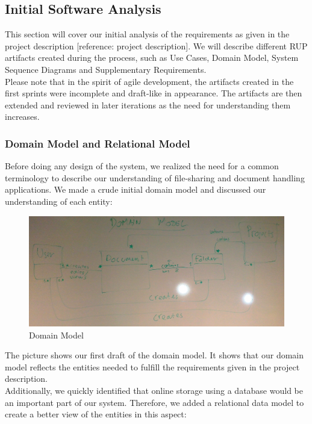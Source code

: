 \subsection{Initial Software Analysis}
This section will cover our initial analysis of the requirements as given in the project description [reference: project description]. We will describe different RUP artifacts created during the process, such as Use Cases, Domain Model, System Sequence Diagrams and Supplementary Requirements.\\
Please note that in the spirit of agile development, the artifacts created in the first sprints were incomplete and draft-like in appearance. The artifacts are then extended and reviewed in later iterations as the need for understanding them increases.\\
\subsubsection{Domain Model and Relational Model}
Before doing any design of the system, we realized the need for a common terminology to describe our understanding of file-sharing and document handling applications. We made a crude initial domain model and discussed our understanding of each entity:\\
\begin{figure}[H]
  \includegraphics[width=\textwidth,natwidth=2208,natheight=957]{illustrations/DomainModel.jpg}
  \caption{Domain Model}
  \label{domainmodel}
\end{figure}
The picture shows our first draft of the domain model. It shows that our domain model reflects the entities needed to fulfill the requirements given in the project description.\\
Additionally, we quickly identified that online storage using a database would be an important part of our system. Therefore, we added a relational data model to create a better view of the entities in this aspect:\\
